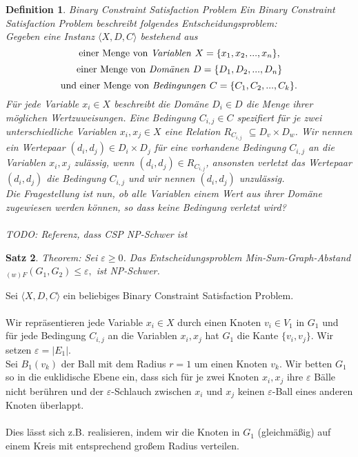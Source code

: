 \documentclass[a4paper, 12pt, twoside]{article}
\theoremstyle{Format1} %
\newtheorem{Def}{Definition}[section]       %
\newtheorem{Satz}[Def]{Satz}                %
\begin{document}
\begin{Def}
	Binary Constraint Satisfaction Problem
	Ein \textit{Binary Constraint Satisfaction Problem} beschreibt folgendes Entscheidungsproblem:
	\\
	Gegeben eine Instanz $\langle X,D,C \rangle$ bestehend aus
	$$ \text{einer Menge von \textit{Variablen }}X = \{x_1, x_2, ..., x_n\},$$
	$$ \text{einer Menge von \textit{Domänen }}D = \{D_1, D_2, ..., D_n\} $$
	$$ \text{und einer Menge von \textit{Bedingungen }}C = \{C_1, C_2, ..., C_k\}. $$
	Für jede Variable $ x_i \in X$ beschreibt die Domäne $ D_i \in D$ die Menge ihrer möglichen Wertzuweisungen.
	Eine Bedingung $C_{i,j} \in C$ spezifiert für je zwei unterschiedliche Variablen $x_i, x_j \in X$ eine Relation $R_{C_{i,j}}$ $\subseteq D_v \times D_w$.
	Wir nennen ein Wertepaar $(d_i, d_j) \in D_i \times D_j$ für eine vorhandene Bedingung $C_{i,j}$ an die Variablen $x_i,x_j$ \textit{zulässig}, wenn $(d_i,d_j) \in R_{C_{i,j}}$,
	ansonsten \textit{verletzt} das Wertepaar $(d_i, d_j)$ die Bedingung $C_{i,j}$ und wir nennen $(d_i,d_j)$ \textit{unzulässig}.
	\\
	Die Fragestellung ist nun, ob alle Variablen einem Wert aus ihrer Domäne zugewiesen werden können, so dass keine Bedingung verletzt wird?
	\\
	\\
	TODO: Referenz, dass CSP NP-Schwer ist
\end{Def}

\begin{Satz}
	Theorem: Sei $\varepsilon \geq 0$. Das Entscheidungsproblem \textit{Min-Sum-Graph-Abstand}$_{(w)F}(G_1, G_2)  \leq  \varepsilon, $ ist NP-Schwer.
\end{Satz}

Sei $\langle X,D,C \rangle$ ein beliebiges Binary Constraint Satisfaction Problem.
\\
\\
Wir repräsentieren jede Variable $x_i \in X$ durch einen Knoten $v_i \in V_1$ in $G_1$ und für jede Bedingung $C_{i,j}$ an die Variablen $x_i, x_j$
hat $G_1$ die Kante $\{v_i, v_j\}$. Wir setzen $\varepsilon = |E_1|$.
\\
Sei $B_1(v_k)$ der Ball mit dem Radius $r=1$ um einen Knoten $v_k$.
Wir betten $G_1$ so in die euklidische Ebene ein, dass sich für je zwei Knoten $x_i,x_j$ ihre $\varepsilon$ Bälle nicht berühren und
der $\varepsilon$-Schlauch zwischen $x_i$ und $x_j$ keinen $\varepsilon$-Ball eines anderen Knoten überlappt.
\\
\\
Dies lässt sich z.B. realisieren, indem wir die Knoten in $G_1$ (gleichmäßig) auf einem Kreis mit entsprechend großem Radius verteilen.
\end{document}
